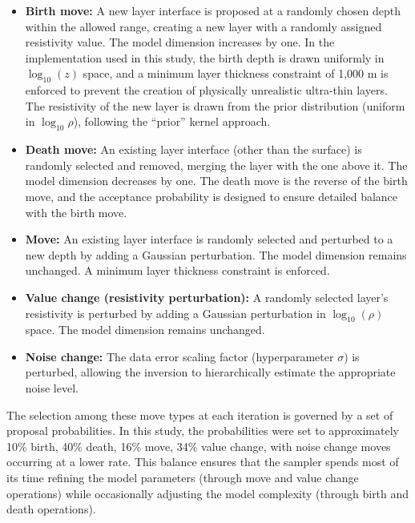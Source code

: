 \begin{itemize}
    \item \textbf{Birth move:} A new layer interface is proposed at a randomly chosen depth within the allowed range, creating a new layer with a randomly assigned resistivity value. The model dimension increases by one. In the implementation used in this study, the birth depth is drawn uniformly in $\log_{10}(z)$ space, and a minimum layer thickness constraint of 1{,}000 m is enforced to prevent the creation of physically unrealistic ultra-thin layers. The resistivity of the new layer is drawn from the prior distribution (uniform in $\log_{10}\rho$), following the ``prior'' kernel approach.

    \item \textbf{Death move:} An existing layer interface (other than the surface) is randomly selected and removed, merging the layer with the one above it. The model dimension decreases by one. The death move is the reverse of the birth move, and the acceptance probability is designed to ensure detailed balance with the birth move.

    \item \textbf{Move:} An existing layer interface is randomly selected and perturbed to a new depth by adding a Gaussian perturbation. The model dimension remains unchanged. A minimum layer thickness constraint is enforced.

    \item \textbf{Value change (resistivity perturbation):} A randomly selected layer's resistivity is perturbed by adding a Gaussian perturbation in $\log_{10}(\rho)$ space. The model dimension remains unchanged.

    \item \textbf{Noise change:} The data error scaling factor (hyperparameter $\sigma$) is perturbed, allowing the inversion to hierarchically estimate the appropriate noise level.
\end{itemize}

The selection among these move types at each iteration is governed by a set of proposal probabilities. In this study, the probabilities were set to approximately 10\% birth, 40\% death, 16\% move, 34\% value change, with noise change moves occurring at a lower rate. This balance ensures that the sampler spends most of its time refining the model parameters (through move and value change operations) while occasionally adjusting the model complexity (through birth and death operations).

